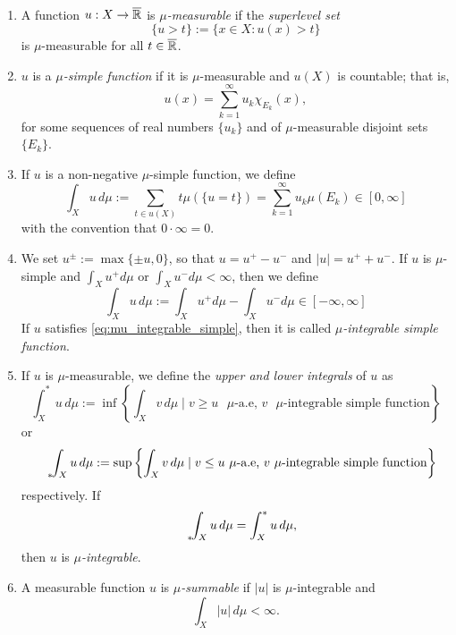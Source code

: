 \begin{definition}~
\begin{enumerate}[(1)]
\item A function $u : X \to \overline{\mathbb{R}}$ is \emph{$\mu$-measurable} if the {\em superlevel set} $$\{u > t\} := \{ x \in X : u(x) > t\}$$ 
is $\mu$-measurable for all $t\in \overline{\mathbb{R}}$.
\item $u$ is a \emph{$\mu$-simple function} if it is $\mu$-measurable and $u(X)$ is
countable; that is, $$u(x) = \sum_{k=1}^\infty u_k \chi_{E_k}(x),$$
for some sequences of real numbers $\{u_{k}\}$ and of $\mu$-measurable disjoint sets $\{E_{k}\}$.
\item If $u$ is a non-negative $\mu$-simple function, we define 
\[
\int_X u \, d\mu := \sum_{t \in u(X)} t\mu(\{u=t\}) = \sum_{k=1}^\infty u_k
\mu(E_k) \in [0,\infty]
\]
with the convention that $0 \cdot \infty = 0$.
\item We set $u^\pm := \max\{\pm u, 0 \}$, so that $u = u^+ - u^-$ and $|u| = u^{+} + u^{-}$. 
If $u$ is $\mu$-simple and $\int_X u^+ d\mu$ or $\int_X u^- d\mu < \infty$, then we define
\begin{equation} \label{eq:mu_integrable_simple}
\int_X u \, d\mu := \int_X u^+ d\mu - \int_X u^- d\mu \in [-\infty,\infty]
\end{equation}
If $u$ satisfies \eqref{eq:mu_integrable_simple}, then it is called {\em $\mu$-integrable simple function}.
\item If $u$ is $\mu$-measurable, we define the {\em upper and lower integrals} of $u$
as
\[
\int^*_X u \, d\mu := \inf \left\{ \int_X v \, d\mu \mid 
\text{$v \geq u$ $\mu$-a.e, $v$ $\mu$-integrable simple function}
\right\}
\]
or
\[
{\phantom{\int}}_{*}\hspace{-0.3em}\int_{X} u \, d\mu := \sup\left\{ \int_X v \, d\mu \mid 
\text{$v \leq u$ $\mu$-a.e, $v$ $\mu$-integrable simple function}
\right\}
\]
respectively. 
If
\[
{\phantom{\int}}_{*}\hspace{-0.3em}\int_{X} u \, d\mu = \int^*_X u \, d\mu,
\]
then $u$ is {\em $\mu$-integrable}.
\item A measurable function $u$ is \emph{$\mu$-summable} if $|u|$ is
$\mu$-integrable and 
\[
\int_X |u| \, d\mu < \infty.
\]
\end{enumerate}
\end{definition}

